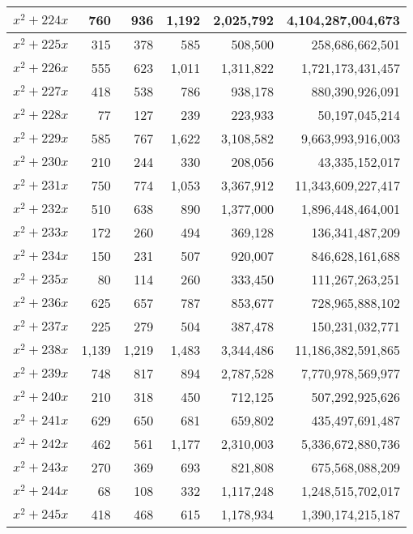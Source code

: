 \documentclass[a4paper]{amsproc}
\theoremstyle{plain}
\begin{document}
\begin{longtable}{ | l | r | r | r | r | r | }
$x^2 + 224x$ & 760 & 936 & 1{,}192 & 2{,}025{,}792 & 4{,}104{,}287{,}004{,}673 \\ \hline
$x^2 + 225x$ & 315 & 378 & 585 & 508{,}500 & 258{,}686{,}662{,}501 \\ \hline
$x^2 + 226x$ & 555 & 623 & 1{,}011 & 1{,}311{,}822 & 1{,}721{,}173{,}431{,}457 \\ \hline
$x^2 + 227x$ & 418 & 538 & 786 & 938{,}178 & 880{,}390{,}926{,}091 \\ \hline
$x^2 + 228x$ & 77 & 127 & 239 & 223{,}933 & 50{,}197{,}045{,}214 \\ \hline
$x^2 + 229x$ & 585 & 767 & 1{,}622 & 3{,}108{,}582 & 9{,}663{,}993{,}916{,}003 \\ \hline
$x^2 + 230x$ & 210 & 244 & 330 & 208{,}056 & 43{,}335{,}152{,}017 \\ \hline
$x^2 + 231x$ & 750 & 774 & 1{,}053 & 3{,}367{,}912 & 11{,}343{,}609{,}227{,}417 \\ \hline
$x^2 + 232x$ & 510 & 638 & 890 & 1{,}377{,}000 & 1{,}896{,}448{,}464{,}001 \\ \hline
$x^2 + 233x$ & 172 & 260 & 494 & 369{,}128 & 136{,}341{,}487{,}209 \\ \hline
$x^2 + 234x$ & 150 & 231 & 507 & 920{,}007 & 846{,}628{,}161{,}688 \\ \hline
$x^2 + 235x$ & 80 & 114 & 260 & 333{,}450 & 111{,}267{,}263{,}251 \\ \hline
$x^2 + 236x$ & 625 & 657 & 787 & 853{,}677 & 728{,}965{,}888{,}102 \\ \hline
$x^2 + 237x$ & 225 & 279 & 504 & 387{,}478 & 150{,}231{,}032{,}771 \\ \hline
$x^2 + 238x$ & 1{,}139 & 1{,}219 & 1{,}483 & 3{,}344{,}486 & 11{,}186{,}382{,}591{,}865 \\ \hline
$x^2 + 239x$ & 748 & 817 & 894 & 2{,}787{,}528 & 7{,}770{,}978{,}569{,}977 \\ \hline
$x^2 + 240x$ & 210 & 318 & 450 & 712{,}125 & 507{,}292{,}925{,}626 \\ \hline
$x^2 + 241x$ & 629 & 650 & 681 & 659{,}802 & 435{,}497{,}691{,}487 \\ \hline
$x^2 + 242x$ & 462 & 561 & 1{,}177 & 2{,}310{,}003 & 5{,}336{,}672{,}880{,}736 \\ \hline
$x^2 + 243x$ & 270 & 369 & 693 & 821{,}808 & 675{,}568{,}088{,}209 \\ \hline
$x^2 + 244x$ & 68 & 108 & 332 & 1{,}117{,}248 & 1{,}248{,}515{,}702{,}017 \\ \hline
$x^2 + 245x$ & 418 & 468 & 615 & 1{,}178{,}934 & 1{,}390{,}174{,}215{,}187 \\ \hline

\end{longtable}
\end{document}
